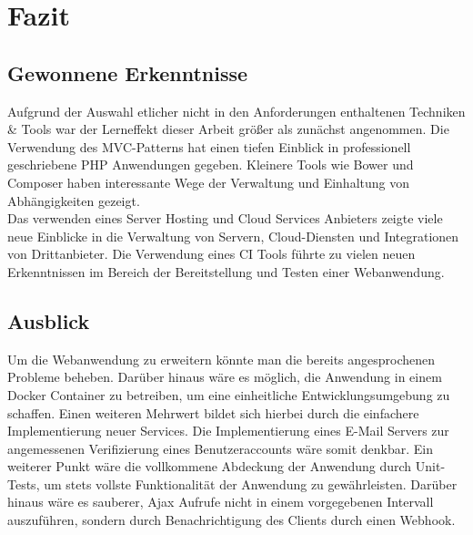 \chapter{Fazit}\label{ch:fazit}
\section{Gewonnene Erkenntnisse}\label{sec:gewonnene-erkenntnisse}
Aufgrund der Auswahl etlicher nicht in den Anforderungen enthaltenen Techniken \&{} Tools war der Lerneffekt dieser Arbeit größer als zunächst angenommen. Die Verwendung des MVC-Patterns hat einen tiefen Einblick in professionell geschriebene PHP Anwendungen gegeben. Kleinere Tools wie Bower und Composer haben interessante Wege der Verwaltung und Einhaltung von Abhängigkeiten gezeigt.\\
Das verwenden eines Server Hosting und Cloud Services Anbieters zeigte viele neue Einblicke in die Verwaltung von Servern, Cloud-Diensten und Integrationen von Drittanbieter. Die Verwendung eines CI Tools führte zu vielen neuen Erkenntnissen im Bereich der Bereitstellung und Testen einer Webanwendung.

\section{Ausblick}\label{sec:ausblick}
Um die Webanwendung zu erweitern könnte man die bereits angesprochenen Probleme beheben.
Darüber hinaus wäre es möglich, die Anwendung in einem Docker Container zu betreiben, um eine einheitliche Entwicklungsumgebung zu schaffen. Einen weiteren Mehrwert bildet sich hierbei durch die einfachere Implementierung neuer Services. Die Implementierung eines E-Mail Servers zur angemessenen Verifizierung eines Benutzeraccounts wäre somit denkbar. 
Ein weiterer Punkt wäre die vollkommene Abdeckung der Anwendung durch Unit-Tests, um stets vollste Funktionalität der Anwendung zu gewährleisten. Darüber hinaus wäre es sauberer, Ajax Aufrufe nicht in einem vorgegebenen Intervall auszuführen, sondern durch Benachrichtigung des Clients durch einen Webhook.